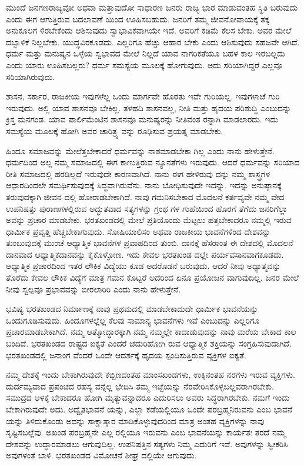 ಮುಂದೆ ಜನಗಣರಾಜ್ಯವೋ ಅಥವಾ ಮತ್ತಾವುದೋ ಸಾಧಾರಣ ಜನರು ರಾಜ್ಯ ಭಾರ ಮಾಡುವಂತಹ ಸ್ಥಿತಿ ಬರುವುದು ಎಂದು ಈಗ ಆಗುತ್ತಿರುವ ಬದಲಾವಣೆ ಯಿಂದ ಊಹಿಸಬಹುದು. ಜನರಿಗೆ ತಮ್ಮ ಜೀವನೋಪಾಯಕ್ಕೆ ತಕ್ಕ ಅನುಕೂಲಗ ಳಿರಬೇಕೆಂದು ಆಶಿಸುವುದು ಸ್ವಾಭಾವಿಕವಾಗಿಯೇ ಇದೆ. ಅವರಿಗೆ ಕಡಿಮೆ ಕೆಲಸ ಬೇಕು. ಅವರ ಮೇಲೆ ದಬ್ಬಾಳಿಕೆ ನಿಲ್ಲಬೇಕು. ಯುದ್ಧವಿರಕೂಡದು. ಎಲ್ಲರಿಗೂ ಹೆಚ್ಚು ಆಹಾರ ಬೇಕು ಎಂದು ಆಶಿಸುವುದು ಸಹಜವೇ ಆಗಿದೆ. ಧರ್ಮ ಮತ್ತು ಮನುಷ್ಯನ ಒಳ್ಳೆಯ ಸ್ವಭಾವದ ಮೇಲೆ ನಿಲ್ಲದೆ ಯಾವ ನಾಗರಿಕತೆಯೂ ಬಹಳ ಕಾಲ ಇರಬಲ್ಲದು ಎಂದು ಯಾರು ಊಹಿಸಬಲ್ಲರು? ಧರ್ಮ ಸಮಸ್ಯೆಯ ಮೂಲಕ್ಕೆ ಹೋಗುವುದು. ಅದು ಸರಿಯಾಗಿದ್ದರೆ ಎಲ್ಲವೂ ಸರಿಯಾಗಿರುವುದು.

ಶಾಸನ, ಸರ್ಕಾರ, ರಾಜಕೀಯ ಇವುಗಳೆಲ್ಲ ಒಂದು ಮಾರ್ಗವೇ ಹೊರತು ಇವೇ ಗುರಿಯಲ್ಲ. ಇವುಗಳಾಚೆ ಗುರಿ ಇರುವುದು. ಅಲ್ಲಿ ಯಾವ ಶಾಸನವೂ ಬೇಕಿಲ್ಲ. ತಳಹದಿ ಶಾಸನವಲ್ಲ, ನೀತಿ ಮತ್ತು ಹೃದಯ ಪರಿಶುದ್ಧಿ ಎಂಬುದನ್ನು ಕ್ರಿಸ್ತ ಮನಗಂಡ. ಯಾವ ಪಾರ್ಲಿಮೆಂಟಿನ ಶಾಸನವೂ ಮನುಷ್ಯರನ್ನು ನೀತಿವಂತ ರನ್ನಾಗಿ ಮಾಡಲಾರದು. ಇದು ಸಮಸ್ಯೆಯ ಮೂಲಕ್ಕೆ ಹೋಗಿ ಅವರ ಚಾರಿತ್ರ್ಯ ವನ್ನು ರೂಢಿಸುವ ಪ್ರಯತ್ನ ಮಾಡಬೇಕು.

ಹಿಂದೂ ಸಮಾಜವನ್ನು ಮೇಲೆತ್ತಬೇಕಾದರೆ ಧರ್ಮವನ್ನು ನಾಶಮಾಡಬೇಕಾ ಗಿಲ್ಲ ಎಂದು ನಾನು ಹೇಳುತ್ತೇನೆ. ಧರ್ಮದಿಂದ ಅಲ್ಲ ನಮ್ಮ ಸಮಾಜದಲ್ಲಿ ಈಗ ಕಾಣುತ್ತಿರುವ ನ್ಯೂನತೆಗಳು ಇರುವುದು. ಆದರೆ ಧರ್ಮವನ್ನು ಸರಿಯಾದ ರೀತಿ ಸಮಾಜದಲ್ಲಿ ಹರಡಿಲ್ಲದೆ ಇರುವುದೇ ಕಾರಣವಾಗಿದೆ. ನಾನು ಈಗ ಹೇಳಿರುವು ದನ್ನು ನಮ್ಮ ಶಾಸ್ತ್ರಗಳ ಆಧಾರದಿಂದಲೇ ಸಮರ್ಥಿಸುವುದಕ್ಕೆ ಸಿದ್ಧವಾಗಿರುವೆನು. ನಾನು ಬೋಧಿಸುವುದೇ ಇದನ್ನು. ಇದನ್ನು ಅನುಷ್ಠಾನಕ್ಕೆ ತರುವುದಕ್ಕಾಗಿ ಜೀವನ ದಲ್ಲಿ ಹೋರಾಡಬೇಕಾಗಿದೆ. ನಾವು ಗಮನಿಸಬೇಕಾದ ಮೊದಲನೆ ಕರ್ತವ್ಯವೇ ನಮ್ಮ ವೇದ ಉಪನಿಷತ್ತು ಪುರಾಣಗಳಲ್ಲಿರುವ ಅದ್ಭುತವಾದ ಸತ್ಯಗಳನ್ನು ಗ್ರಂಥ ಗಳ ಗುಹೆಯಿಂದ ಹೊರಗೆ ತೆಗೆದು ಜನರಿಗೆಲ್ಲಾ ಅವನ್ನು ಪ್ರಚಾರ ಮಾಡಬೇಕು. ಭರತಖಂಡದಲ್ಲಿ ಮೇಲೆ ಪ್ರತಿಯೊಂದು ಮೆಟ್ಟಲು ಹತ್ತಬೇಕಾದರೂ ನಮ್ಮಲ್ಲಿ ಇರುವ ಧಾರ್ಮಿಕ ಪ್ರವೃತ್ತಿ ಹೆಚ್ಚಬೇಕಾಗುವುದು. ಸೋಷಿಯಾಲಿಸಂ ಅಥವಾ ರಾಜಕೀಯ ಭಾವನೆಗಳಿಂದ ದೇಶವನ್ನು ತುಂಬುವುದಕ್ಕೆ ಮುಂಚೆ ಆಧ್ಯಾತ್ಮಿಕ ಭಾವನೆಗಳ ಪ್ರವಾಹದಿಂದ ತುಂಬಿ. ದಾನಕ್ಕೆ ಹೆಸರಾಂತ ಈ ದೇಶದಲ್ಲಿ ಮೊದಲನೆ ದಾನವಾದ ಆಧ್ಯಾತ್ಮಿಕದಾನವನ್ನು ಕೈಕೊಳ್ಳೋಣ. ಇದು ಕೇವಲ ಭರತಖಂಡ ದಲ್ಲೇ ಪರ್ಯವಸಾನವಾಗಕೂಡದು. ಆಧ್ಯಾತ್ಮಿಕ ಪ್ರಚಾರದಿಂದ ಇತರ ಲೌಕಿಕ ವಿದ್ಯೆಯು ಕೂಡ ಅದರೊಡನೆ ಬರುವುದು. ಆದರೆ ನೀವು ಅಧ್ಯಾತ್ಮವನ್ನು ತೊರೆದು ಕೇವಲ ಲೌಕಿಕ ವಿದ್ಯೆಗೆ ಮಾತ್ರ ಗಮನ ಕೊಟ್ಟರೆ ಅದರಿಂದ ಏನೂ ಪ್ರಯೋಜನ ವಾಗುವುದಿಲ್ಲ. ಜನರ ಮೇಲೆ ನೀವು ಸ್ವಲ್ಪವೂ ಪ್ರಭಾವವನ್ನು ಬೀರಲಾರಿರಿ ಎಂದು ನಾನು ಹೇಳುತ್ತೇನೆ.

ಭವಿಷ್ಯ ಭರತಖಂಡದ ನಿರ್ಮಾಣಕ್ಕೆ ನಾವು ಪ್ರಥಮದಲ್ಲಿ ಮಾಡಬೇಕಾದುದೇ ಧಾರ್ಮಿಕ ಭಾವನೆಯನ್ನು ಒಂದುಗೂಡಿಸುವುದು. ಹಿಂದೂಗಳಲ್ಲೆಲ್ಲ ಕೆಲವು ಸಾಮಾನ್ಯ ಭಾವನೆಗಳು ಇವೆ ಎಂಬುದನ್ನು ಎಲ್ಲರಿಗೂ ಪ್ರಚಾರಮಾಡಬೇಕಾಗಿದೆ. ನಮ್ಮ ಆತ್ಮೋದ್ಧಾರಕ್ಕಾಗಿ ನಮ್ಮ ನಮ್ಮಲ್ಲೇ ಕಾದಾಡುವುದನ್ನು ನಾವು ಮರೆಯ ಬೇಕಾದ ಕಾಲ ಬಂದಿದೆ. ಭರತಖಂಡದ ರಾಷ್ಟ್ರದ ಐಕ್ಯತೆ ಎಂದರೆ ಚದುರಿಹೋಗಿ ರುವ ಆಧ್ಯಾತ್ಮಿಕ ಶಕ್ತಿಯನ್ನು ಸಂಗ್ರಹಿಸುವುದಾಗಿದೆ. ಭರತಖಂಡದಲ್ಲಿ ಜನಾಂಗ ವೆಂದರೆ ಒಂದೇ ಆದರ್ಶಕ್ಕೆ ಹೃದಯ ಸ್ಪಂದಿಸುತ್ತಿರುವ ವ್ಯಕ್ತಿಗಳ ಐಕ್ಯತೆ.

ನಮ್ಮ ದೇಶಕ್ಕೆ ಇಂದು ಬೇಕಾಗಿರುವುದೇ ಕಬ್ಬಿಣದಂತಹ ಮಾಂಸಖಂಡಗಳು, ಉಕ್ಕಿನಂತಹ ನರಗಳು ಇರುವ ವ್ಯಕ್ತಿಗಳು. ದುರ್ದಮ್ಯವಾದ ಪ್ರಪಂಚದ ರಹಸ್ಯ ವನ್ನೆಲ್ಲ ಭೇದಿಸಿ ತಮ್ಮ ಇಚ್ಛೆಯನ್ನು ನೆರವೇರಿಸಿಕೊಳ್ಳಬಲ್ಲವರಾಗಿರಬೇಕು. ಸಮುದ್ರದ ಆಳಕ್ಕೆ ಬೇಕಾದರೂ ಹೋಗಿ ಮೃತ್ಯುವನ್ನಾದರೂ ಎದುರಿಸಲು ಅವರು ಸಿದ್ಧರಾಗಿರಬೇಕು. ನಮಗೆ ಇಂದು ಬೇಕಾಗಿರುವುದೇ ಅದು. ಅದ್ವೈತಭಾವನೆ ಯನ್ನು, ಎಲ್ಲಾ ಕಡೆಯಲ್ಲಿಯೂ ಒಂದೇ ಪರಬ್ರಹ್ಮನಿರುವನು ಎಂಬ ಭಾವನೆ ಯನ್ನು ತಿಳಿದುಕೊಂಡು ಅದನ್ನು ಸಾಕ್ಷಾತ್ಕಾರ ಮಾಡಿಕೊಳ್ಳುವುದರಿಂದ ಮಾತ್ರ ಅಂತಹ ವ್ಯಕ್ತಿಗಳನ್ನು ನಾವು ಸೃಷ್ಟಿಸಬಲ್ಲೆವು. ಅಖಂಡ ಪರಬ್ರಹ್ಮನೇ ಎಲ್ಲ ರಲ್ಲಿಯೂ ಇರುವನು ಎಂಬ ಭಾವನೆಯನ್ನು ಕಾರ್ಯತಃ ತರದೆ ನಮ್ಮ ದೇಶವನ್ನು ಉದ್ಧಾರಮಾಡಲು ಆಗುವುದಿಲ್ಲ. ಉಪನಿಷತ್ತಿನ ಸತ್ಯಗಳು ನಿಮ್ಮ ಎದುರಿಗೆ ಇವೆ. ಅವುಗಳನ್ನು ಸ್ವೀಕರಿಸಿ ಅವುಗಳಂತೆ ಬಾಳಿ. ಭರತಖಂಡದ ವಿಮೋಚನೆ ಶೀಘ್ರ ದಲ್ಲಿಯೇ ಆಗುವುದು.

